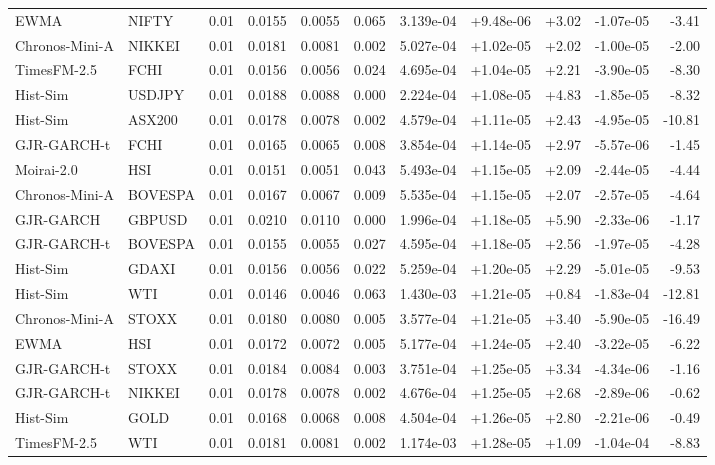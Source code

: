 \begin{tabular}{llrrrrrrrrr}
EWMA & NIFTY & 0.01 & 0.0155 & 0.0055 & 0.065 & 3.139e-04 & +9.48e-06 & +3.02 & -1.07e-05 & -3.41 \\
Chronos-Mini-A & NIKKEI & 0.01 & 0.0181 & 0.0081 & 0.002 & 5.027e-04 & +1.02e-05 & +2.02 & -1.00e-05 & -2.00 \\
TimesFM-2.5 & FCHI & 0.01 & 0.0156 & 0.0056 & 0.024 & 4.695e-04 & +1.04e-05 & +2.21 & -3.90e-05 & -8.30 \\
Hist-Sim & USDJPY & 0.01 & 0.0188 & 0.0088 & 0.000 & 2.224e-04 & +1.08e-05 & +4.83 & -1.85e-05 & -8.32 \\
Hist-Sim & ASX200 & 0.01 & 0.0178 & 0.0078 & 0.002 & 4.579e-04 & +1.11e-05 & +2.43 & -4.95e-05 & -10.81 \\
GJR-GARCH-t & FCHI & 0.01 & 0.0165 & 0.0065 & 0.008 & 3.854e-04 & +1.14e-05 & +2.97 & -5.57e-06 & -1.45 \\
Moirai-2.0 & HSI & 0.01 & 0.0151 & 0.0051 & 0.043 & 5.493e-04 & +1.15e-05 & +2.09 & -2.44e-05 & -4.44 \\
Chronos-Mini-A & BOVESPA & 0.01 & 0.0167 & 0.0067 & 0.009 & 5.535e-04 & +1.15e-05 & +2.07 & -2.57e-05 & -4.64 \\
GJR-GARCH & GBPUSD & 0.01 & 0.0210 & 0.0110 & 0.000 & 1.996e-04 & +1.18e-05 & +5.90 & -2.33e-06 & -1.17 \\
GJR-GARCH-t & BOVESPA & 0.01 & 0.0155 & 0.0055 & 0.027 & 4.595e-04 & +1.18e-05 & +2.56 & -1.97e-05 & -4.28 \\
Hist-Sim & GDAXI & 0.01 & 0.0156 & 0.0056 & 0.022 & 5.259e-04 & +1.20e-05 & +2.29 & -5.01e-05 & -9.53 \\
Hist-Sim & WTI & 0.01 & 0.0146 & 0.0046 & 0.063 & 1.430e-03 & +1.21e-05 & +0.84 & -1.83e-04 & -12.81 \\
Chronos-Mini-A & STOXX & 0.01 & 0.0180 & 0.0080 & 0.005 & 3.577e-04 & +1.21e-05 & +3.40 & -5.90e-05 & -16.49 \\
EWMA & HSI & 0.01 & 0.0172 & 0.0072 & 0.005 & 5.177e-04 & +1.24e-05 & +2.40 & -3.22e-05 & -6.22 \\
GJR-GARCH-t & STOXX & 0.01 & 0.0184 & 0.0084 & 0.003 & 3.751e-04 & +1.25e-05 & +3.34 & -4.34e-06 & -1.16 \\
GJR-GARCH-t & NIKKEI & 0.01 & 0.0178 & 0.0078 & 0.002 & 4.676e-04 & +1.25e-05 & +2.68 & -2.89e-06 & -0.62 \\
Hist-Sim & GOLD & 0.01 & 0.0168 & 0.0068 & 0.008 & 4.504e-04 & +1.26e-05 & +2.80 & -2.21e-06 & -0.49 \\
TimesFM-2.5 & WTI & 0.01 & 0.0181 & 0.0081 & 0.002 & 1.174e-03 & +1.28e-05 & +1.09 & -1.04e-04 & -8.83 \\

\end{tabular}
